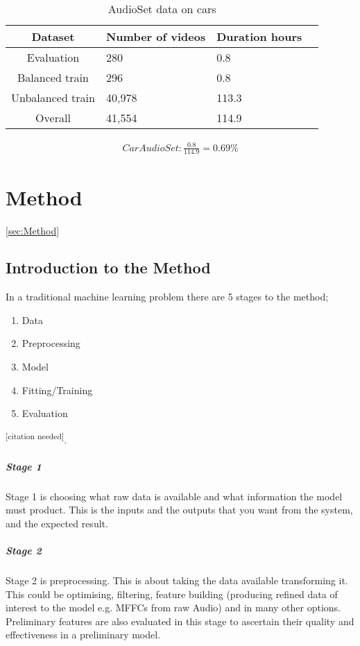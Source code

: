 \documentclass{UoNMCHA}
\newcommand{\citationneeded}{\textsuperscript{\color{blue} [citation needed]}}
\numberwithin{equation}{section}
\begin{document}
\begin{table}[h!]
    \begin{center}
        \caption{AudioSet data on cars}\label{tab:AudioSetCars}
        {\footnotesize
            \begin{tabular}{c l l l|}
                \hline\hline Dataset & Number of videos & Duration hours \\ \hline 
                Evaluation & 280 & 0.8 \\
                Balanced train & 296 & 0.8 \\
                Unbalanced train & 40,978 & 113.3 \\
                Overall & 41,554 & 114.9 \\
                \hline
            \end{tabular}
        }
    \end{center}
\end{table}
\begin{gather*}
    Car AudioSet:  \frac{0.8}{114.9}=0.69\%
\end{gather*}

\section{Method}\ref{sec:Method}
\subsection{Introduction to the Method}
In a traditional machine learning problem there are 5 stages to the method; 

\begin{enumerate}[start=1,label={Stage \arabic*:}]
    \item Data
    \item Preprocessing
    \item Model
    \item Fitting/Training
    \item Evaluation
\end{enumerate}

\citationneeded.

\subparagraph{Stage 1}
Stage 1 is choosing what raw data is available and what information the model must product. This is the inputs and the outputs that you want from the system, and the expected result.

\subparagraph{Stage 2}
Stage 2 is preprocessing. This is about taking the data available transforming it. This could be optimising, filtering, feature building (producing refined data of interest to the model e.g. MFFCs from raw Audio) and in many other options. Preliminary features are also evaluated in this stage to ascertain their quality and effectiveness in a preliminary model.
\end{document}
